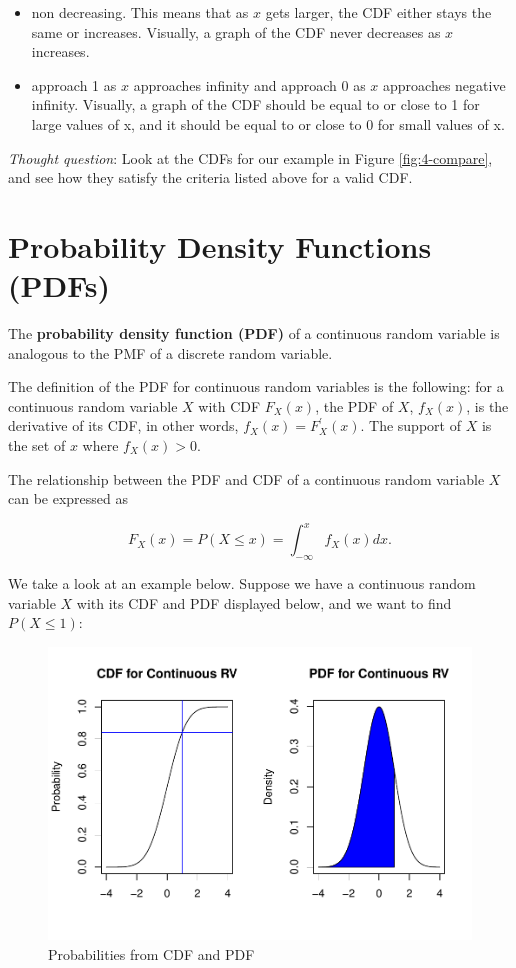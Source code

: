 \documentclass[
]{book}
\providecommand{\tightlist}{%
  \setlength{\itemsep}{0pt}\setlength{\parskip}{0pt}}
\begin{document}
\begin{itemize}
\tightlist
\item
  non decreasing. This means that as \(x\) gets larger, the CDF either stays the same or increases. Visually, a graph of the CDF never decreases as \(x\) increases.
\item
  approach 1 as \(x\) approaches infinity and approach 0 as \(x\) approaches negative infinity. Visually, a graph of the CDF should be equal to or close to 1 for large values of x, and it should be equal to or close to 0 for small values of x.
\end{itemize}

\emph{Thought question}: Look at the CDFs for our example in Figure \ref{fig:4-compare}, and see how they satisfy the criteria listed above for a valid CDF.

\section{Probability Density Functions (PDFs)}\label{probability-density-functions-pdfs}

The \textbf{probability density function (PDF)} of a continuous random variable is analogous to the PMF of a discrete random variable.

The definition of the PDF for continuous random variables is the following: for a continuous random variable \(X\) with CDF \(F_X(x)\), the PDF of \(X\), \(f_X(x)\), is the derivative of its CDF, in other words, \(f_X(x) = F_X^{\prime}(x)\). The support of \(X\) is the set of \(x\) where \(f_X(x) >0\).

The relationship between the PDF and CDF of a continuous random variable \(X\) can be expressed as

\begin{equation} 
F_X(x) = P(X \leq x) = \int_{-\infty}^{x} f_X(x) dx.
\label{eq:4-PDFCDF}
\end{equation}

We take a look at an example below. Suppose we have a continuous random variable \(X\) with its CDF and PDF displayed below, and we want to find \(P(X \leq 1)\):

\begin{figure}
\centering
\includegraphics{bookdown-demo_files/figure-latex/4-prob-1.pdf}
\caption{\label{fig:4-prob}Probabilities from CDF and PDF}
\end{figure}
\end{document}

